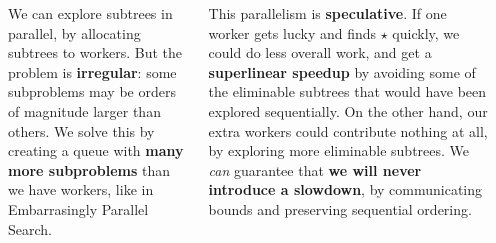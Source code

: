 \documentclass[20pt,a1paper,landscape]{tikzposter}
\begin{document}
\begin{columns}
{\begin{center}
\end{center}

    We can explore subtrees in parallel, by allocating subtrees to workers. But the problem is
    \textbf{irregular}: some subproblems may be orders of magnitude larger than others.  We solve
    this by creating a queue with \textbf{many more subproblems} than we have workers, like in
    Embarrasingly Parallel Search.

    \bigskip

    This parallelism is \textbf{speculative}. If one worker gets lucky and finds $\star$ quickly, we
    could do less overall work, and get a \textbf{superlinear speedup} by avoiding some of the
    eliminable subtrees that would have been explored sequentially. On the other hand, our extra
    workers could contribute nothing at all, by exploring more eliminable subtrees. We \emph{can}
    guarantee that \textbf{we will never introduce a slowdown}, by communicating bounds and
    preserving sequential ordering.
}


\end{columns}
\end{document}

